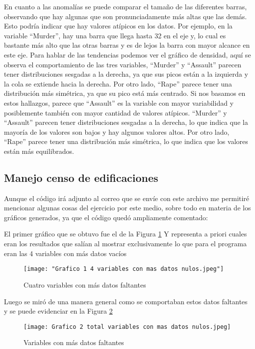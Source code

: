 \documentclass[12pt]{article}
\begin{document}
En cuanto a las anomalías se puede comparar el tamaño de las diferentes barras, observando que hay algunas que son pronunciadamente más altas que las demás. Esto podría indicar que hay valores atípicos en los datos. Por ejemplo, en la variable “Murder”, hay una barra que llega hasta 32 en el eje y, lo cual es bastante más alto que las otras barras y es de lejos la barra con mayor alcance en este eje.
Para hablar de las tendencias podemos ver el gráfico de densidad, aquí se observa el comportamiento de las tres variables, “Murder” y “Assault” parecen tener distribuciones sesgadas a la derecha, ya que sus picos están a la izquierda y la cola se extiende hacia la derecha. Por otro lado, “Rape” parece tener una distribución más simétrica, ya que su pico está más centrado.
Si nos basamos en estos hallazgos, parece que “Assault” es la variable con mayor variabilidad y posiblemente también con mayor cantidad de valores atípicos. “Murder” y “Assault” parecen tener distribuciones sesgadas a la derecha, lo que indica que la mayoría de los valores son bajos y hay algunos valores altos. Por otro lado, “Rape” parece tener una distribución más simétrica, lo que indica que los valores están más equilibrados.

\subsection{Manejo censo de edificaciones}
Aunque el código irá adjunto al correo que se envíe con este archivo me permitiré mencionar algunas cosas del ejercicio por este medio, sobre todo en materia de los gráficos generados, ya que el código quedó ampliamente comentado:

El primer gráfico que se obtuvo fue el de la Figura \ref{fig:4-nulos} Y representa a priori cuales eran los resultados que salían al mostrar exclusivamente lo que para el programa eran las 4 variables con más datos vacíos

\begin{figure}[H] %
    \centering %
    \texttt{[image: "Grafico 1 4 variables con mas datos nulos.jpeg"]}
    \caption{Cuatro variables con más datos faltantes}
    \label{fig:4-nulos}
\end{figure}
Luego se miró de una manera general como se comportaban estos datos faltantes y se puede evidenciar en la Figura \ref{fig:TotalVariables}
\begin{figure}[H] %
    \centering %
    \texttt{[image: Grafico 2 total variables con mas datos nulos.jpeg]}
    \caption{Variables con más datos faltantes}
    \label{fig:TotalVariables}
\end{figure}
\end{document}
